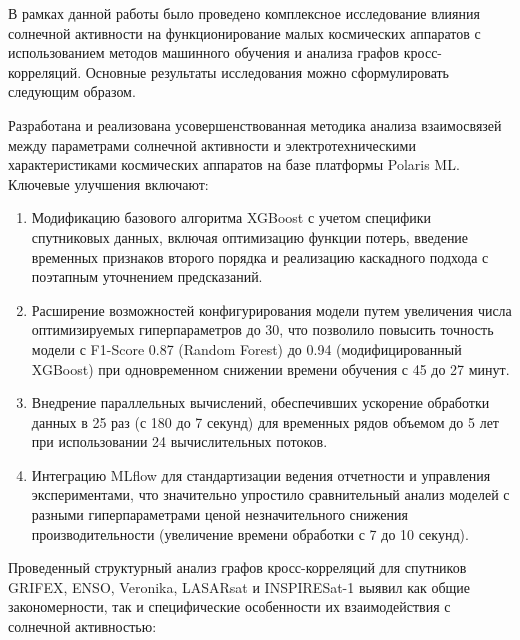 В рамках данной работы было проведено комплексное исследование влияния солнечной
активности на функционирование малых космических аппаратов с использованием
методов машинного обучения и анализа графов кросс-корреляций. Основные
результаты исследования можно сформулировать следующим образом.

Разработана и реализована усовершенствованная методика анализа взаимосвязей
между параметрами солнечной активности и электротехническими характеристиками
космических аппаратов на базе платформы Polaris ML. Ключевые улучшения включают:

\begin{enumerate}
	\item Модификацию базового алгоритма XGBoost с учетом специфики спутниковых данных, включая оптимизацию функции потерь, введение временных признаков второго порядка и реализацию каскадного подхода с поэтапным уточнением предсказаний.

	\item Расширение возможностей конфигурирования модели путем увеличения числа оптимизируемых гиперпараметров до 30, что позволило повысить точность модели с F1-Score 0.87 (Random Forest) до 0.94 (модифицированный XGBoost) при одновременном снижении времени обучения с 45 до 27 минут.

	\item Внедрение параллельных вычислений, обеспечивших ускорение обработки данных в 25 раз (с 180 до 7 секунд) для временных рядов объемом до 5 лет при использовании 24 вычислительных потоков.

	\item Интеграцию MLflow для стандартизации ведения отчетности и управления экспериментами, что значительно упростило сравнительный анализ моделей с разными гиперпараметрами ценой незначительного снижения производительности (увеличение времени обработки с 7 до 10 секунд).
\end{enumerate}

Проведенный структурный анализ графов кросс-корреляций для спутников GRIFEX,
ENSO, Veronika, LASARsat и INSPIRESat-1 выявил как общие закономерности, так и
специфические особенности их взаимодействия с солнечной активностью:


